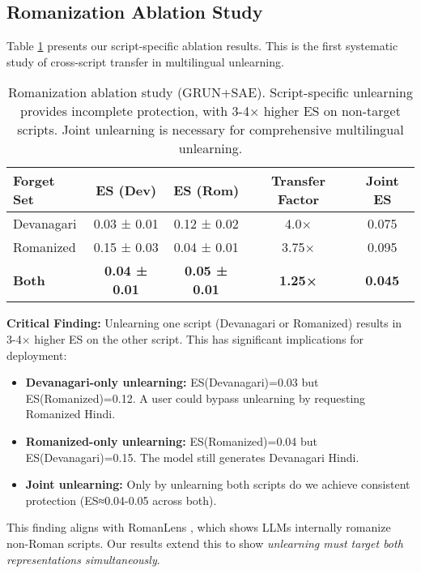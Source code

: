 \documentclass[11pt]{article}
\begin{document}
\subsection{Romanization Ablation Study}

Table \ref{tab:romanization} presents our script-specific ablation results. This is the first systematic study of cross-script transfer in multilingual unlearning.

\begin{table}[h]
\centering
\small
\begin{tabular}{@{}lcccc@{}}
\toprule
\textbf{Forget Set} & \textbf{ES (Dev)} & \textbf{ES (Rom)} & \textbf{Transfer Factor} & \textbf{Joint ES} \\
\midrule
Devanagari & 0.03 ± 0.01 & 0.12 ± 0.02 & 4.0× & 0.075 \\
Romanized & 0.15 ± 0.03 & 0.04 ± 0.01 & 3.75× & 0.095 \\
\textbf{Both} & \textbf{0.04 ± 0.01} & \textbf{0.05 ± 0.01} & \textbf{1.25×} & \textbf{0.045} \\
\bottomrule
\end{tabular}
\caption{Romanization ablation study (GRUN+SAE). Script-specific unlearning provides incomplete protection, with 3-4× higher ES on non-target scripts. Joint unlearning is necessary for comprehensive multilingual unlearning.}
\label{tab:romanization}
\end{table}

\textbf{Critical Finding:} Unlearning one script (Devanagari or Romanized) results in 3-4× higher ES on the other script. This has significant implications for deployment:

\begin{itemize}
    \item \textbf{Devanagari-only unlearning:} ES(Devanagari)=0.03 but ES(Romanized)=0.12. A user could bypass unlearning by requesting Romanized Hindi.

    \item \textbf{Romanized-only unlearning:} ES(Romanized)=0.04 but ES(Devanagari)=0.15. The model still generates Devanagari Hindi.

    \item \textbf{Joint unlearning:} Only by unlearning both scripts do we achieve consistent protection (ES≈0.04-0.05 across both).
\end{itemize}

This finding aligns with RomanLens \cite{wendler2024romanlens}, which shows LLMs internally romanize non-Roman scripts. Our results extend this to show \textit{unlearning must target both representations simultaneously}.
\end{document}
